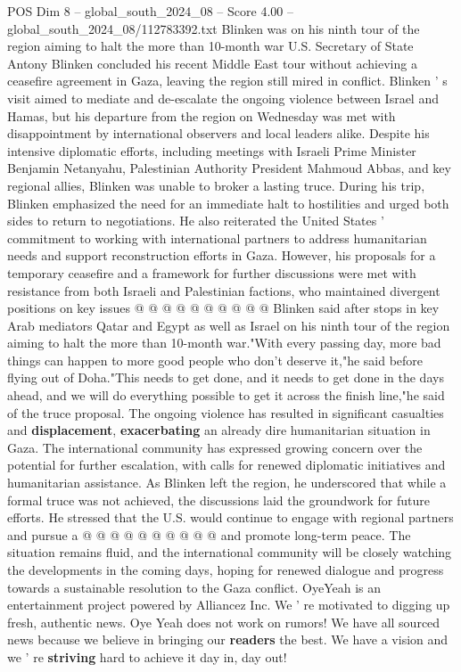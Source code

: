 \begin{textsample}{POS Dim 8 – global\_south\_2024\_08 – Score 4.00 – global\_south\_2024\_08/112783392.txt}  \label{ex:f8_pos_373}
Blinken was on his ninth tour of the region aiming to halt the more than 10-month war U.S.
Secretary of State Antony Blinken concluded his recent Middle East tour without achieving a ceasefire agreement in Gaza, leaving the region still mired in conflict.
Blinken ' s visit aimed to mediate and de-escalate the ongoing violence between Israel and Hamas, but his departure from the region on Wednesday was met with disappointment by international observers and local leaders alike.
Despite his intensive diplomatic efforts, including meetings with Israeli Prime Minister Benjamin Netanyahu, Palestinian Authority President Mahmoud Abbas, and key regional allies, Blinken was unable to broker a lasting truce.
During his trip, Blinken emphasized the need for an immediate halt to hostilities and urged both sides to return to negotiations.
He also reiterated the United States ' commitment to working with international partners to address humanitarian needs and support reconstruction efforts in Gaza.
However, his proposals for a temporary ceasefire and a framework for further discussions were met with resistance from both Israeli and Palestinian factions, who maintained divergent positions on key issues @ @ @ @ @ @ @ @ @ @ Blinken said after stops in key Arab mediators Qatar and Egypt as well as Israel on his ninth tour of the region aiming to halt the more than 10-month war."With every passing day, more bad things can happen to more good people who don't deserve it,"he said before flying out of Doha."This needs to get done, and it needs to get done in the days ahead, and we will do everything possible to get it across the finish line,"he said of the truce proposal.
The ongoing violence has resulted in significant casualties and \textbf{displacement}, \textbf{exacerbating} an already dire humanitarian situation in Gaza.
The international community has expressed growing concern over the potential for further escalation, with calls for renewed diplomatic initiatives and humanitarian assistance.
As Blinken left the region, he underscored that while a formal truce was not achieved, the discussions laid the groundwork for future efforts.
He stressed that the U.S. would continue to engage with regional partners and pursue a @ @ @ @ @ @ @ @ @ @ and promote long-term peace.
The situation remains fluid, and the international community will be closely watching the developments in the coming days, hoping for renewed dialogue and progress towards a sustainable resolution to the Gaza conflict.
OyeYeah is an entertainment project powered by Alliancez Inc.
We ' re motivated to digging up fresh, authentic news.
Oye Yeah does not work on rumors!
We have all sourced news because we believe in bringing our \textbf{readers} the best.
We have a vision and we ' re \textbf{striving} hard to achieve it day in, day out!

\end{textsample}
